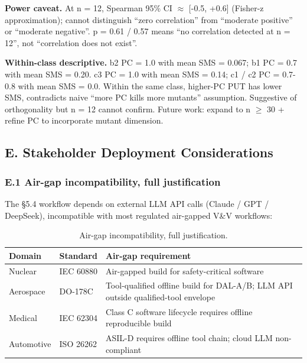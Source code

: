\documentclass[review,12pt,authoryear]{elsarticle}
\begin{document}
\textbf{Power caveat.} At n = 12, Spearman 95\% CI $\approx$ {[}-0.5, +0.6{]}
(Fisher-z approximation); cannot distinguish ``zero correlation'' from ``moderate positive'' or
``moderate negative''. p = 0.61 / 0.57 means ``no correlation detected
at n = 12'', not ``correlation does not exist''.

\textbf{Within-class descriptive.} b2 PC = 1.0 with mean SMS = 0.067; b1
PC = 0.7 with mean SMS = 0.20. c3 PC = 1.0 with mean SMS = 0.14; c1 / c2
PC = 0.7-0.8 with mean SMS = 0.0. Within the same class, higher-PC PUT
has lower SMS, contradicts naive ``more PC kills more mutants''
assumption. Suggestive of orthogonality but n = 12 cannot confirm. Future work:
expand to n $\geq$ 30 + refine PC to incorporate mutant dimension.


\subsection{E. Stakeholder Deployment Considerations}\label{e.-stakeholder-deployment-considerations-single-output-kernels-scope}

\subsubsection{E.1 Air-gap incompatibility, full justification}\label{e.1-air-gap-incompatibility-full-justification}

The §5.4 workflow depends on external LLM API calls (Claude / GPT /
DeepSeek), incompatible with most regulated air-gapped V\&V workflows:

{\def\LTcaptype{table} %
\begin{longtable}[]{@{}
  >{\raggedright\arraybackslash}p{}
  >{\raggedright\arraybackslash}p{}
  >{\raggedright\arraybackslash}p{}@{}}
\caption{Air-gap incompatibility, full justification.}\label{tab:p2-25}\\
\toprule\noalign{}
\begin{minipage}[b]{\linewidth}\raggedright
Domain
\end{minipage} & \begin{minipage}[b]{\linewidth}\raggedright
Standard
\end{minipage} & \begin{minipage}[b]{\linewidth}\raggedright
Air-gap requirement
\end{minipage} \\
\midrule\noalign{}
\endfirsthead
\endhead
\bottomrule\noalign{}
\endlastfoot
Nuclear & IEC 60880 & Air-gapped build for safety-critical software \\
Aerospace & DO-178C & Tool-qualified offline build for DAL-A/B; LLM API
outside qualified-tool envelope \\
Medical & IEC 62304 & Class C software lifecycle requires offline
reproducible build \\
Automotive & ISO 26262 & ASIL-D requires offline tool chain; cloud LLM
non-compliant \\
\end{longtable}
}
\end{document}
